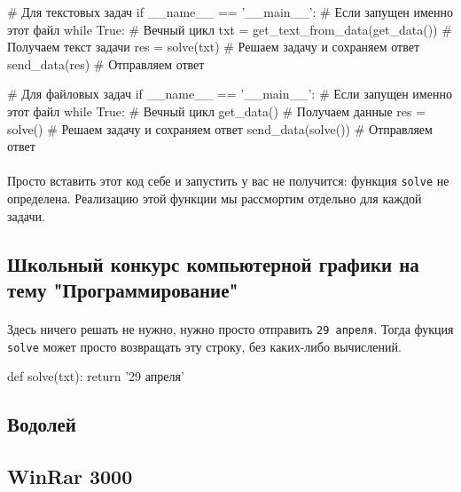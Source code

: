 \documentclass[12pt]{article}
\begin{document}
    \begin{pythoncode}
# Для текстовых задач
if __name__ == '__main__': # Если запущен именно этот файл
    while True: # Вечный цикл
        txt = get_text_from_data(get_data())      # Получаем текст задачи
        res = solve(txt)                          # Решаем задачу и сохраняем ответ
        send_data(res)                            # Отправляем ответ
    \end{pythoncode}

    \begin{pythoncode}
# Для файловых задач
if __name__ == '__main__': # Если запущен именно этот файл
    while True: # Вечный цикл
        get_data()                                # Получаем данные
        res = solve()                             # Решаем задачу и сохраняем ответ
        send_data(solve())                        # Отправляем ответ
    \end{pythoncode}

    \paragraph{}
    Просто вставить этот код себе и запустить у вас не получится: функция \verb|solve| не определена.
    Реализацию этой функции мы рассмортим отдельно для каждой задачи.

    \newpage


    \subsection{Школьный конкурс компьютерной графики на тему "Программирование"}
    \paragraph{}
    Здесь ничего решать не нужно, нужно просто отправить \verb|29 апреля|.
    Тогда фукция \verb|solve| может просто возвращать эту строку, без каких-либо вычислений.
    \begin{pythoncode}
def solve(txt):
    return '29 апреля'
    \end{pythoncode}


    \subsection{Водолей}


    \subsection{WinRar 3000}
\end{document}
